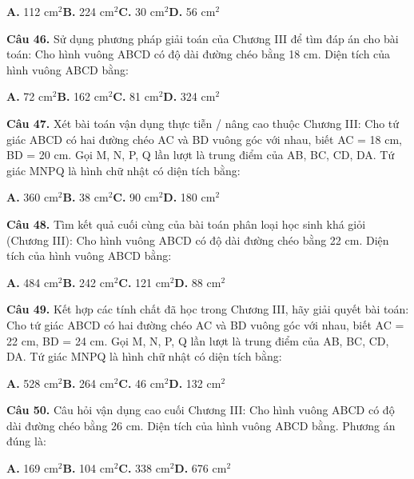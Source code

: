 \documentclass[11pt,a4paper]{article}
\begin{document}
\hspace*{1.5em}\textbf{A.} 112 cm$^2$\quad\quad \textbf{B.} 224 cm$^2$\quad\quad \textbf{C.} 30 cm$^2$\quad\quad \textbf{D.} 56 cm$^2$\par\vspace{2pt}
\textbf{\color{primary} Câu 46.} Sử dụng phương pháp giải toán của Chương III để tìm đáp án cho bài toán: Cho hình vuông ABCD có độ dài đường chéo bằng 18 cm. Diện tích của hình vuông ABCD bằng:\par
\hspace*{1.5em}\textbf{A.} 72 cm$^2$\quad\quad \textbf{B.} 162 cm$^2$\quad\quad \textbf{C.} 81 cm$^2$\quad\quad \textbf{D.} 324 cm$^2$\par\vspace{2pt}
\textbf{\color{primary} Câu 47.} Xét bài toán vận dụng thực tiễn / nâng cao thuộc Chương III: Cho tứ giác ABCD có hai đường chéo AC và BD vuông góc với nhau, biết AC = 18 cm, BD = 20 cm. Gọi M, N, P, Q lần lượt là trung điểm của AB, BC, CD, DA. Tứ giác MNPQ là hình chữ nhật có diện tích bằng:\par
\hspace*{1.5em}\textbf{A.} 360 cm$^2$\quad\quad \textbf{B.} 38 cm$^2$\quad\quad \textbf{C.} 90 cm$^2$\quad\quad \textbf{D.} 180 cm$^2$\par\vspace{2pt}
\textbf{\color{primary} Câu 48.} Tìm kết quả cuối cùng của bài toán phân loại học sinh khá giỏi (Chương III): Cho hình vuông ABCD có độ dài đường chéo bằng 22 cm. Diện tích của hình vuông ABCD bằng:\par
\hspace*{1.5em}\textbf{A.} 484 cm$^2$\quad\quad \textbf{B.} 242 cm$^2$\quad\quad \textbf{C.} 121 cm$^2$\quad\quad \textbf{D.} 88 cm$^2$\par\vspace{2pt}
\textbf{\color{primary} Câu 49.} Kết hợp các tính chất đã học trong Chương III, hãy giải quyết bài toán: Cho tứ giác ABCD có hai đường chéo AC và BD vuông góc với nhau, biết AC = 22 cm, BD = 24 cm. Gọi M, N, P, Q lần lượt là trung điểm của AB, BC, CD, DA. Tứ giác MNPQ là hình chữ nhật có diện tích bằng:\par
\hspace*{1.5em}\textbf{A.} 528 cm$^2$\quad\quad \textbf{B.} 264 cm$^2$\quad\quad \textbf{C.} 46 cm$^2$\quad\quad \textbf{D.} 132 cm$^2$\par\vspace{2pt}
\textbf{\color{primary} Câu 50.} Câu hỏi vận dụng cao cuối Chương III: Cho hình vuông ABCD có độ dài đường chéo bằng 26 cm. Diện tích của hình vuông ABCD bằng. Phương án đúng là:\par
\hspace*{1.5em}\textbf{A.} 169 cm$^2$\quad\quad \textbf{B.} 104 cm$^2$\quad\quad \textbf{C.} 338 cm$^2$\quad\quad \textbf{D.} 676 cm$^2$\par\vspace{2pt}
\end{document}
